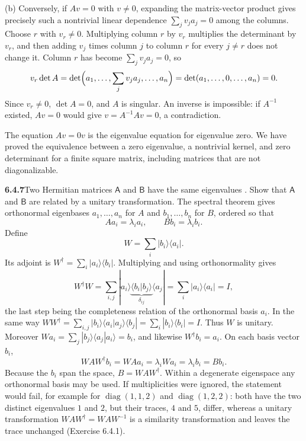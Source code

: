 (b) Conversely, if $Av=0$ with $v\ne0$, expanding the matrix-vector
product gives precisely such a nontrivial linear dependence
$\sum_jv_ja_j=0$ among the columns. Choose $r$ with $v_r\ne0$.
Multiplying column $r$ by $v_r$ multiplies the determinant by $v_r$,
and then adding $v_j$ times column $j$ to column $r$ for every $j\ne r$
does not change it. Column $r$ has become $\sum_jv_ja_j=0$, so
\[
v_r\det A=\det\Bigl(a_1,\ldots,\sum_jv_ja_j,\ldots,a_n\Bigr)
=\det(a_1,\ldots,0,\ldots,a_n)=0.
\]
Since $v_r\ne0$, $\det A=0$, and $A$ is singular.
An inverse is impossible: if $A^{-1}$ existed, $Av=0$ would give
$v=A^{-1}Av=0$, a contradiction.

The equation $Av=0v$ is the eigenvalue equation for eigenvalue zero.
We have proved the equivalence between a zero eigenvalue, a nontrivial
kernel, and zero determinant for a finite square matrix, including
matrices that are not diagonalizable.

\par\bigskip
\noindent\textbf{6.4.7}\quad Two Hermitian matrices $\mathsf{A}$ and
$\mathsf{B}$ have the same eigenvalues . Show that $\mathsf{A}$ and
$\mathsf{B}$ are related by a unitary transformation.
\solution
{} The spectral theorem gives orthonormal eigenbases
$a_1,\ldots,a_n$ for $A$ and $b_1,\ldots,b_n$ for $B$, ordered so that
\[
Aa_i=\lambda_i a_i,\qquad Bb_i=\lambda_i b_i.
\]
Define
\[
W=\sum_i|b_i\rangle\langle a_i|.
\]
Its adjoint is $W^\dagger=\sum_i|a_i\rangle\langle b_i|$. Multiplying
and using orthonormality gives
\[
W^\dagger W=\sum_{i,j}|a_i\rangle
 \underbrace{\langle b_i|b_j\rangle}_{\delta_{ij}}\langle a_j|
=\sum_i|a_i\rangle\langle a_i|=I,
\]
the last step being the completeness relation of the orthonormal basis
$a_i$. In the same way
$WW^\dagger=\sum_{i,j}|b_i\rangle\langle a_i|a_j\rangle\langle b_j|
=\sum_i|b_i\rangle\langle b_i|=I$. Thus $W$ is unitary. Moreover
$Wa_i=\sum_j|b_j\rangle\langle a_j|a_i\rangle=b_i$, and likewise
$W^\dagger b_i=a_i$. On each basis vector $b_i$,
\[
WAW^\dagger b_i=WAa_i=\lambda_iWa_i=\lambda_i b_i=Bb_i.
\]
Because the $b_i$ span the space, $\boxed{B=WAW^\dagger}$.
Within a degenerate eigenspace any orthonormal basis may be used.
If multiplicities were ignored, the statement would fail, for example
for $\operatorname{diag}(1,1,2)$ and $\operatorname{diag}(1,2,2)$:
both have the two distinct eigenvalues $1$ and $2$, but their traces,
$4$ and $5$, differ, whereas a unitary transformation
$WAW^\dagger=WAW^{-1}$ is a similarity transformation and leaves the
trace unchanged (Exercise 6.4.1).


